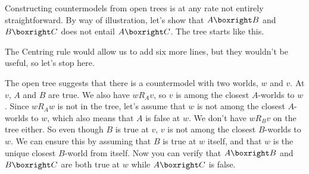 Constructing countermodels from open trees is at any rate not entirely
straightforward. By way of illustration, let's show that
$A\boxright B$ and $B\boxright C$ does not entail $A \boxright C$. The
tree starts like this.

\begin{center}
\end{center}
The Centring rule would allow us to add six more lines, but they
wouldn't be useful, so let's stop here.

The open tree suggests that there is a countermodel with two worlds, $w$ and
$v$. At $v$, $A$ and $B$ are true. We also have $wR_Av$, so $v$ is among the
closest $A$-worlds to $w$. Since $wR_A w$ is not in the tree, let's assume that
$w$ is not among the closest $A$-worlds to $w$, which also means that $A$ is
false at $w$. We don't have $wR_B v$ on the tree either. So even though $B$ is
true at $v$, $v$ is not among the closest $B$-worlds to $w$. We can ensure this
by assuming that $B$ is true at $w$ itself, and that $w$ is the unique closest
$B$-world from itself. Now you can verify that $A \boxright B$ and
$B \boxright C$ are both true at $w$ while $A \boxright C$ is false.


